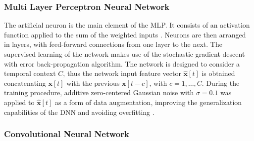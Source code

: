 \subsubsection{Multi Layer Perceptron Neural Network}
The artificial neuron is the main element of the MLP. It consists of an activation function applied to the sum of the weighted inputs \cite{Rumelhart86-LRB}. Neurons are then arranged in layers, with feed-forward connections from one layer to the next. The supervised learning of the network makes use of the stochastic gradient descent with error back-propagation algorithm. The network is designed to consider a temporal context  $C$, thus the network input  feature vector  $\hat{\mathbf{x}}[t]$ is obtained concatenating $\mathbf{x}[t]$ with the previous $\mathbf{x}[t - c]$, with $c = 1, \dots, C$. 
During the training procedure, additive zero-centered Gaussian noise with $\sigma=0.1$ was applied to $\hat{\mathbf{x}}[t]$ as a form of data augmentation, improving the generalization capabilities of the DNN and avoiding overfitting \cite{marchi2017deep}.


\subsubsection{Convolutional Neural Network}
\label{ssec:CNN}

